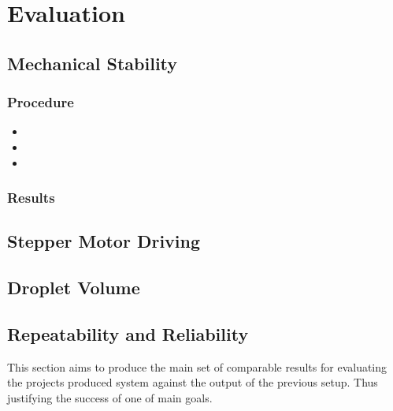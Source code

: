 \chapter{Evaluation}\label{C:eval}


\section{Mechanical Stability}

\subsection{Procedure}
\begin{itemize}
    \item
    \item
    \item
\end{itemize}

\subsection{Results}

\section{Stepper Motor Driving}

\section{Droplet Volume}

\section{Repeatability and Reliability}

This section aims to produce the main set of comparable results for evaluating the projects produced system against the output of the previous setup. Thus justifying the success of one of main goals.

